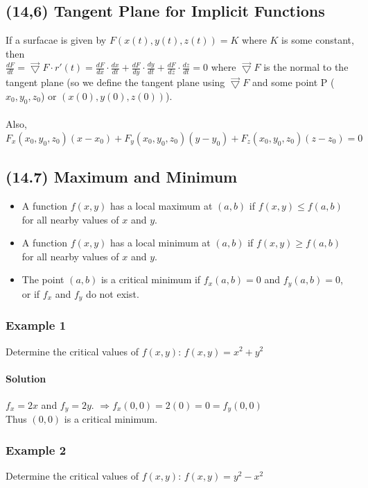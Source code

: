 \documentclass{article}
\newcommand{\tri}{\vec{\bigtriangledown}}
\newcommand{\der}[2]{\frac{d #1}{d #2}}
\begin{document}
\newpage \subsection{(14,6) Tangent Plane for Implicit Functions}
If a surfacae is given by $F(x(t),y(t),z(t))=K$ where $K$ is some constant, then
\\$\der{F}{t}=\tri F\cdot r'(t)=\der{F}{x}\cdot\der{x}{t}+\der{F}{y}\cdot\der{y}{t}+\der{F}{z}\cdot\der{z}{t}=0$
where $\tri F$ is the normal to the tangent plane (so we define the tangent plane using $\tri F$ and some point P ($x_0,y_0,z_0$) or $(x(0),y(0),z(0))$).
\\\\Also, $F_x(x_0,y_0,z_0)(x-x_0)+F_y(x_0,y_0,z_0)(y-y_0)+F_z(x_0,y_0,z_0)(z-z_0)=0$

\subsection{(14.7) Maximum and Minimum}
\begin{itemize}
    \itemsep 0em
    \item A function $f(x,y)$ has a local maximum at $(a,b)$ if $f(x,y)\leq f(a,b)$ for all nearby values of $x$ and $y$.
    \item A function $f(x,y)$ has a local minimum at $(a,b)$ if $f(x,y)\geq f(a,b)$ for all nearby values of $x$ and $y$.
    \item The point $(a,b)$ is a critical minimum if $f_x(a,b)=0$ and $f_y(a,b)=0$, or if $f_x$ and $f_y$ do not exist.
\end{itemize}
\subsubsection{Example 1}
Determine the critical values of $f(x,y)$: $f(x,y)=x^2+y^2$
\paragraph{Solution} $f_x=2x$ and $f_y=2y$. $\Rightarrow f_x(0,0)=2(0)=0=f_y(0,0)$
\\Thus $(0,0)$ is a critical minimum.

\subsubsection{Example 2}
Determine the critical values of $f(x,y)$: $f(x,y)=y^2-x^2$
\end{document}
